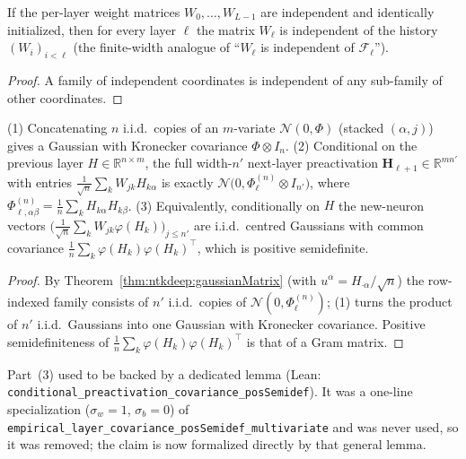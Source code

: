 \begin{lemma}\label{lem:ntkdeep:independenceDepth}
  \leanok
If the per-layer weight matrices $W_0,\dots,W_{L-1}$ are independent and identically initialized, then for every layer $\ell$ the matrix $W_\ell$ is independent of the history $(W_i)_{i<\ell}$ (the finite-width analogue of ``$W_\ell$ is independent of $\mathcal F_\ell$'').
\end{lemma}

\begin{proof}
  \leanok
A family of independent coordinates is independent of any sub-family of other coordinates.
\end{proof}

\begin{theorem}\label{thm:ntkdeep:kronecker}
  \leanok
(1) Concatenating $n$ i.i.d.\ copies of an $m$-variate $\mathcal N(0,\Phi)$ (stacked $(\alpha,j)$) gives a Gaussian with Kronecker covariance $\Phi\otimes I_n$.
(2) Conditional on the previous layer $H\in\mathbb R^{n\times m}$, the full width-$n'$ next-layer preactivation $\mathbf H_{\ell+1}\in\mathbb R^{mn'}$ with entries $\frac1{\sqrt n}\sum_kW_{jk}H_{k\alpha}$ is exactly $\mathcal N\bigl(0,\Phi^{(n)}_\ell\otimes I_{n'}\bigr)$, where $\Phi^{(n)}_{\ell,\alpha\beta}=\frac1n\sum_kH_{k\alpha}H_{k\beta}$.
(3) Equivalently, conditionally on $H$ the new-neuron vectors $\bigl(\frac1{\sqrt n}\sum_kW_{jk}\varphi(H_k)\bigr)_{j\le n'}$ are i.i.d.\ centred Gaussians with common covariance $\frac1n\sum_k\varphi(H_k)\varphi(H_k)^\top$, which is positive semidefinite.
\end{theorem}

\begin{proof}
  \leanok
By Theorem~\ref{thm:ntkdeep:gaussianMatrix} (with $u^\alpha=H_{\cdot\alpha}/\sqrt n$) the row-indexed family consists of $n'$ i.i.d.\ copies of $\mathcal N(0,\Phi^{(n)}_\ell)$; (1) turns the product of $n'$ i.i.d.\ Gaussians into one Gaussian with Kronecker covariance. Positive semidefiniteness of $\frac1n\sum_k\varphi(H_k)\varphi(H_k)^\top$ is that of a Gram matrix.
\end{proof}

\begin{remark}\label{rmk:ntkdeep:kroneckerChange}
Part~(3) used to be backed by a dedicated lemma (Lean: \texttt{conditional\_preactivation\_covariance\_posSemidef}). It was a one-line specialization ($\sigma_w=1$, $\sigma_b=0$) of \texttt{empirical\_layer\_covariance\_posSemidef\_multivariate} and was never used, so it was removed; the claim is now formalized directly by that general lemma.
\end{remark}


